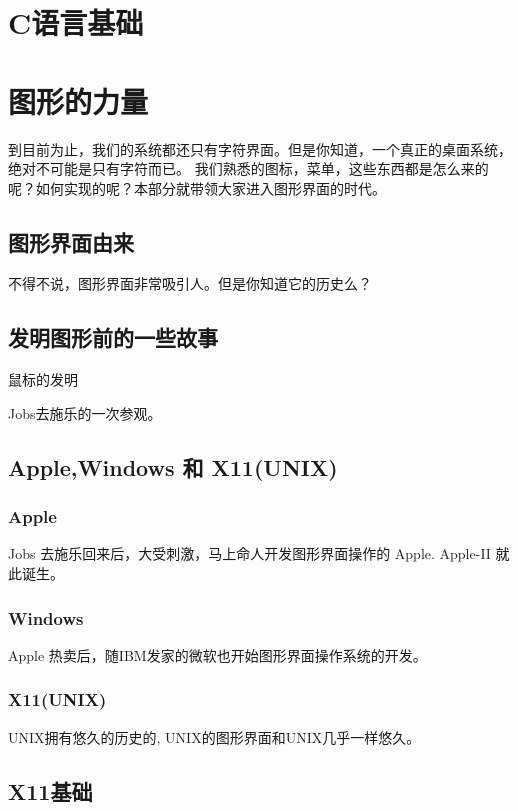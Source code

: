 \documentclass[cm-default,no-math,SlantFont,CJKnumber,a4papper,oneside]{ctexbook}
\begin{document}
\part{C语言基础}

\part{图形的力量} \nopagebreak
\begin{table}[c]
到目前为止，我们的系统都还只有字符界面。但是你知道，一个真正的桌面系统，绝对不可能是只有字符而已。
我们熟悉的图标，菜单，这些东西都是怎么来的呢？如何实现的呢？本部分就带领大家进入图形界面的时代。
\end{table}

\chapter{图形界面由来}

不得不说，图形界面非常吸引人。但是你知道它的历史么？

\chapter{发明图形前的一些故事}

鼠标的发明

Jobs去施乐的一次参观。

\chapter{Apple,Windows 和 X11(UNIX)}
\section{Apple}
Jobs 去施乐回来后，大受刺激，马上命人开发图形界面操作的 Apple. Apple-II 就此诞生。
\section{Windows}
Apple 热卖后，随IBM发家的微软也开始图形界面操作系统的开发。
\section{X11(UNIX)}
UNIX拥有悠久的历史的, UNIX的图形界面和UNIX几乎一样悠久。

\chapter{X11基础}
\end{document}
